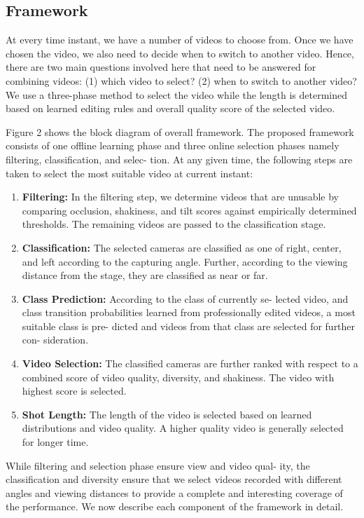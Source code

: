 \documentclass{sig-alternate}
\begin{document}
\subsection{Framework}
At every time instant, we have a number of videos to choose
from. Once we have chosen the video, we also need to decide when
to switch to another video. Hence, there are two main questions
involved here that need to be answered for combining videos: (1)
which video to select? (2) when to switch to another video? We
use a three-phase method to select the video while the length is
determined based on learned editing rules and overall quality score
of the selected video.\par
Figure 2 shows the block diagram of overall framework. The
proposed framework consists of one offline learning phase and three online selection phases namely filtering, classification, and selec-
tion. At any given time, the following steps are taken to select the
most suitable video at current instant:\\
\begin{enumerate}
    \item \textbf{Filtering:} In the filtering step, we determine videos that are
unusable by comparing occlusion, shakiness, and tilt scores
against empirically determined thresholds. The remaining
videos are passed to the classification stage.
 \item \textbf{Classification:} The selected cameras are classified as one
of right, center, and left according to the capturing angle.
Further, according to the viewing distance from the stage,
they are classified as near or far.
\item \textbf{Class Prediction:} According to the class of currently se-
lected video, and class transition probabilities learned from
professionally edited videos, a most suitable class is pre-
dicted and videos from that class are selected for further con-
sideration.
\item \textbf{Video Selection:} The classified cameras are further ranked
with respect to a combined score of video quality, diversity,
and shakiness. The video with highest score is selected.
\item \textbf{Shot Length:} The length of the video is selected based on
learned distributions and video quality. A higher quality video
is generally selected for longer time.
\end{enumerate}
\par While filtering and selection phase ensure view and video qual-
ity, the classification and diversity ensure that we select videos
recorded with different angles and viewing distances to provide a
complete and interesting coverage of the performance. We now
describe each component of the framework in detail.
\end{document}
